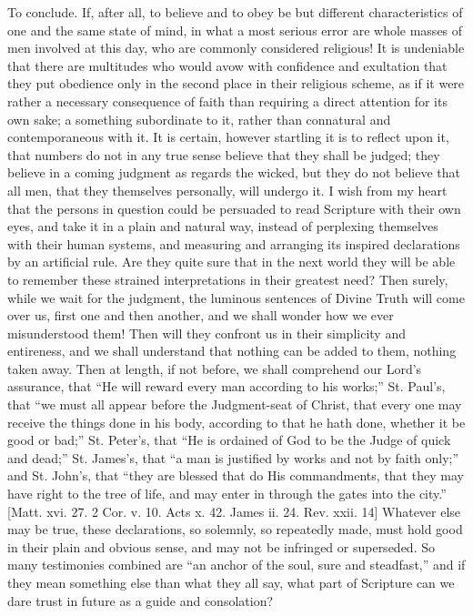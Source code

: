 To conclude. If, after all, to believe and to obey be but different
characteristics of one and the same state of mind, in what a most
serious error are whole masses of men involved at this day, who are
commonly considered religious! It is undeniable that there are
multitudes who would avow with confidence and exultation that they put
obedience only in the second place in their religious scheme, as if it
were rather a necessary consequence of faith than requiring a direct
attention for its own sake; a something subordinate to it, rather than
connatural and contemporaneous with it. It is certain, however
startling it is to reflect upon it, that numbers do not in any true
sense believe that they shall be judged; they believe in a coming
judgment as regards the wicked, but they do not believe that all men,
that they themselves personally, will undergo it. I wish from my heart
that the persons in question could be persuaded to read Scripture with
their own eyes, and take it in a plain and natural way, instead of
perplexing themselves with their human systems, and measuring and
arranging its inspired declarations by an artificial rule. Are they
quite sure that in the next world they will be able to remember these
strained interpretations in their greatest need? Then surely, while we
wait for the judgment, the luminous sentences of Divine Truth will
come over us, first one and then another, and we shall wonder how we
ever misunderstood them! Then will they confront us in their
simplicity and entireness, and we shall understand that nothing can be
added to them, nothing taken away. Then at length, if not before, we
shall comprehend our Lord's assurance, that ``He will reward
every man according to his works;'' St. Paul's, that ``we
must all appear before the Judgment-seat of Christ, that every one may
receive the things done in his body, according to that he hath done,
whether it be good or bad;'' St. Peter's, that ``He is
ordained of God to be the Judge of quick and dead;'' St. James's,
that ``a man is justified by works and not by faith only;''
and St. John's, that ``they are blessed that do His
commandments, that they may have right to the tree of life, and may
enter in through the gates into the city.'' [Matt. xvi. 27. 2 Cor.
v. 10. Acts x. 42. James ii. 24. Rev. xxii. 14] Whatever else may be
true, these declarations, so solemnly, so repeatedly made, must hold
good in their plain and obvious sense, and may not be infringed or
superseded. So many testimonies combined are ``an anchor of the
soul, sure and steadfast,'' and if they mean something else than
what they all say, what part of Scripture can we dare trust in future
as a guide and consolation?

